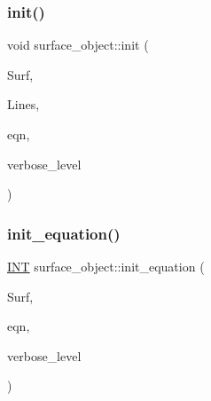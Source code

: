 \mbox{\label{classsurface__object_a078879fb001ac8384f2cc41d26049c81}} 
\subsubsection{\texorpdfstring{init()}{init()}}
{\footnotesize\ttfamily void surface\+\_\+object\+::init (\begin{DoxyParamCaption}\item[{\mbox{\hyperlink{classsurface}{surface}} $\ast$}]{Surf,  }\item[{\mbox{\hyperlink{galois_8h_a09fddde158a3a20bd2dcadb609de11dc}{I\+NT}} $\ast$}]{Lines,  }\item[{\mbox{\hyperlink{galois_8h_a09fddde158a3a20bd2dcadb609de11dc}{I\+NT}} $\ast$}]{eqn,  }\item[{\mbox{\hyperlink{galois_8h_a09fddde158a3a20bd2dcadb609de11dc}{I\+NT}}}]{verbose\+\_\+level }\end{DoxyParamCaption})}

\mbox{\label{classsurface__object_afd4f4d1accbf361897374bd18d571913}} 
\subsubsection{\texorpdfstring{init\+\_\+equation()}{init\_equation()}}
{\footnotesize\ttfamily \mbox{\hyperlink{galois_8h_a09fddde158a3a20bd2dcadb609de11dc}{I\+NT}} surface\+\_\+object\+::init\+\_\+equation (\begin{DoxyParamCaption}\item[{\mbox{\hyperlink{classsurface}{surface}} $\ast$}]{Surf,  }\item[{\mbox{\hyperlink{galois_8h_a09fddde158a3a20bd2dcadb609de11dc}{I\+NT}} $\ast$}]{eqn,  }\item[{\mbox{\hyperlink{galois_8h_a09fddde158a3a20bd2dcadb609de11dc}{I\+NT}}}]{verbose\+\_\+level }\end{DoxyParamCaption})}

\mbox{\label{classsurface__object_ae64b2ea950f99fb467960a0f2cbe7aa7}} 
